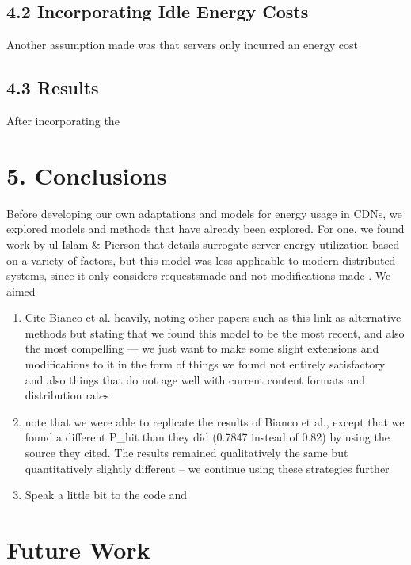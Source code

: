\documentclass[
	a4paper, %
	10pt, %
	unnumberedsections, %
	twoside, %
]{LTJournalArticle}
\begin{document}
\subsection{4.2 Incorporating Idle Energy Costs}
Another assumption made was that servers only incurred an energy cost 
\subsection{4.3 Results}
After incorporating the 


\section{5. Conclusions}

Before developing our own adaptations and models for energy usage in CDNs, we explored models and methods that have already been explored. For one, we found work by ul Islam \& Pierson that details surrogate server energy utilization based on a variety of factors, but this model was less applicable to modern distributed systems, since it only considers requestsmade and not modifications made \cite{ulIslam2012}. We aimed
\begin{enumerate}
    \item Cite Bianco et al. heavily, noting other papers such as \href{https://link.springer.com/chapter/10.1007/978-3-642-32606-6\_6}{this link} as alternative methods but stating that we found this model to be the most recent, and also the most compelling --- we just want to make some slight extensions and modifications to it in the form of things we found not entirely satisfactory and also things that do not age well with current content formats and distribution rates
    \item note that we were able to replicate the results of Bianco et al., except that we found a different P\_hit than they did (0.7847 instead of 0.82) by using the source they cited. The results remained qualitatively the same but quantitatively slightly different -- we continue using these strategies further
    \item Speak a little bit to the code and
\end{enumerate}

\section{Future Work}

\end{document}
